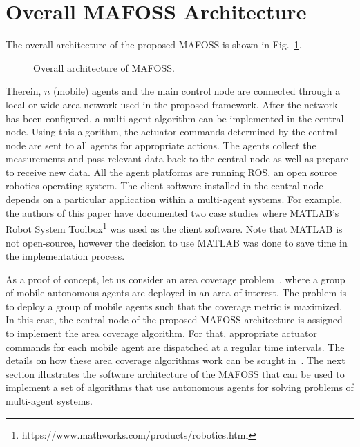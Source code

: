 \section{Overall MAFOSS Architecture}
\label{sec:overallArchitecture}
The overall architecture of the proposed MAFOSS is shown in  Fig.~\ref{fig:MAFOSS-OverallArchitecture}. %
%
\begin{figure}
  \centering
    \caption{Overall architecture of MAFOSS.}
    \label{fig:MAFOSS-OverallArchitecture}
\end{figure}
%
Therein, $n$ (mobile) agents and the main control node are connected through a local or wide area network used in the proposed framework. After the network has been configured, a multi-agent algorithm can be implemented in the central node. Using this algorithm, the actuator commands determined by the central node are sent to all agents for appropriate actions. The agents collect the measurements and pass relevant data back to the central node as well as prepare to receive new data. All the agent platforms are running ROS, an open source robotics operating system. The client software installed in the central node depends on a particular application within a multi-agent systems. For example, the authors of this paper have documented two case studies where MATLAB's Robot System Toolbox\footnote{https://www.mathworks.com/products/robotics.html} was used as the client software. Note that MATLAB is not open-source, however the decision to use MATLAB was done to save time in the implementation process.  

As a proof of concept, let us consider an area coverage problem~\cite{MiKn2018-j1,MiFaSp2017-j1,MiPaFaSp2017-j1,MiNgBoSp2015-j1}, where a group of mobile autonomous agents are deployed in an area of interest. The problem is to deploy a group of mobile agents such that the coverage metric is maximized. In this case, the central node of the proposed MAFOSS architecture is assigned to implement the area coverage algorithm. For that, appropriate actuator commands for each mobile agent are dispatched at a regular time intervals. The details on how these area coverage algorithms work can be sought in~\cite{MiKn2018-j1,MiFaSp2017-j1,MiPaFaSp2017-j1,MiNgBoSp2015-j1}.  The next section illustrates the software architecture of the MAFOSS that can be used to implement a set of algorithms that use autonomous agents for solving problems of multi-agent systems.
  

